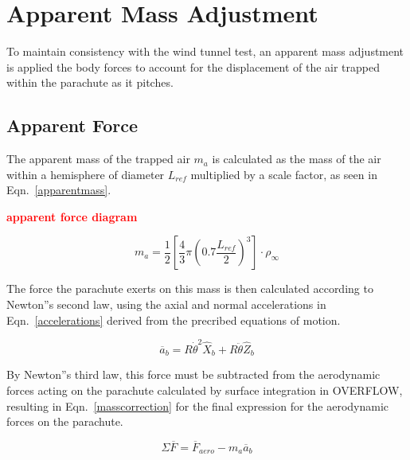 \documentclass[]{aiaa-tc}%
\begin{document}
\section{Apparent Mass Adjustment} \label{appmass} %

To maintain consistency with the wind tunnel test, an apparent mass adjustment is applied the body forces to account for the displacement of the air trapped within the parachute as it pitches.

\subsection{Apparent Force}

The apparent mass of the trapped air $m_a$ is calculated as the mass of the air within a hemisphere of diameter $L_{ref}$ multiplied by a scale factor, as seen in Eqn.~\ref{apparentmass}.

\textcolor{red}{\textbf{apparent force diagram}}

\begin{equation} \label{apparentmass}
  m_a = \frac{1}{2} \left[ \frac{4}{3}\pi \left( 0.7\frac{L_{ref}}{2} \right)^3 \right] \cdot \rho_{\infty}
\end{equation}

The force the parachute exerts on this mass is then calculated according to Newton''s second law, using the axial and normal accelerations in Eqn.~\ref{accelerations} derived from the precribed equations of motion.

\begin{equation} \label{accelerations}
  \overline{a}_b = R\dot{\theta}^2 \hat{X}_b + R\ddot{\theta} \hat{Z}_b
\end{equation}

By Newton''s third law, this force must be subtracted from the aerodynamic forces acting on the parachute calculated by surface integration in OVERFLOW, resulting in Eqn.~\ref{masscorrection} for the final expression for the aerodynamic forces on the parachute.

\begin{equation} \label{masscorrection}
  \Sigma \overline{F} = \overline{F}_{aero} - m_a\overline{a}_b
\end{equation}


\end{document}
